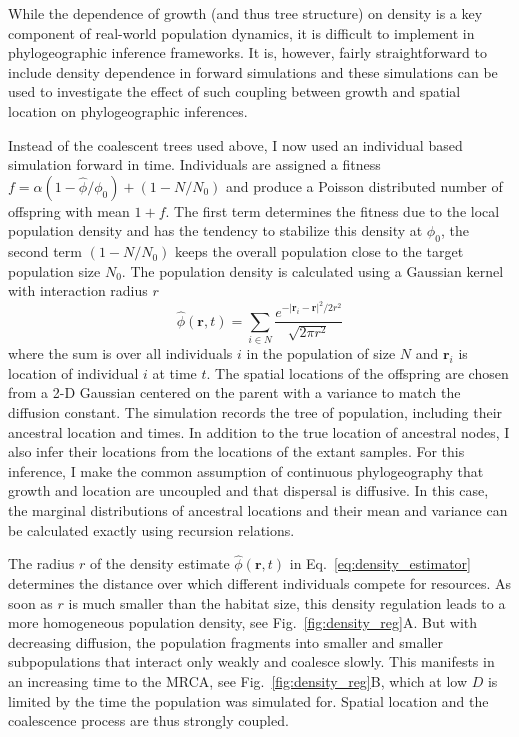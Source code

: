 \documentclass[aps,rmp, twocolumn]{revtex4}
\newcommand{\rvec}{\mathbf{r}}
\begin{document}
While the dependence of growth (and thus tree structure) on density is a key component of real-world population dynamics, it is difficult to implement in phylogeographic inference frameworks.
It is, however, fairly straightforward to include density dependence in forward simulations and these simulations can be used to investigate the effect of such coupling between growth and spatial location on phylogeographic inferences.

Instead of the coalescent trees used above, I now used an individual based simulation forward in time.
Individuals are assigned a fitness $f=\alpha(1-\hat{\phi}/\phi_0) + (1-N/N_0)$ and produce a Poisson distributed number of offspring with mean $1+f$.
The first term determines the fitness due to the local population density and has the tendency to stabilize this density at $\phi_0$, the second term $(1-N/N_0)$ keeps the overall population close to the target population size $N_0$.
The population density is calculated using a Gaussian kernel with interaction radius $r$
\begin{equation}
    \label{eq:density_estimator}
    \hat{\phi}(\rvec, t) = \sum_{i\in N} \frac{e^{-|\rvec_i - \rvec|^2/2r^2}}{\sqrt{2\pi r^2}}
\end{equation}
where the sum is over all individuals $i$ in the population of size $N$ and $\rvec_i$ is location of individual $i$ at time $t$.
The spatial locations of the offspring are chosen from a 2-D Gaussian centered on the parent with a variance to match the diffusion constant.
The simulation records the tree of population, including their ancestral location and times.
In addition to the true location of ancestral nodes, I also infer their locations from the locations of the extant samples.
For this inference, I make the common assumption of continuous phylogeography that growth and location are uncoupled and that dispersal is diffusive.
In this case, the marginal distributions of ancestral locations and their mean and variance can be calculated exactly using recursion relations.

The radius $r$ of the density estimate $\hat{\phi}(\rvec, t)$ in Eq.~\ref{eq:density_estimator} determines the distance over which different individuals compete for resources.
As soon as $r$ is much smaller than the habitat size, this density regulation leads to a more homogeneous population density, see Fig.~\ref{fig:density_reg}A.
But with decreasing diffusion, the population fragments into smaller and smaller subpopulations that interact only weakly and coalesce slowly.
This manifests in an increasing time to the MRCA, see Fig.~\ref{fig:density_reg}B, which at low $D$ is limited by the time the population was simulated for.
Spatial location and the coalescence process are thus strongly coupled.
\end{document}
